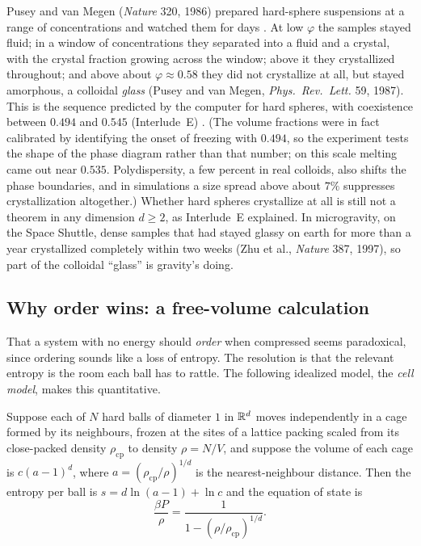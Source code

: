 Pusey and van Megen (\emph{Nature} 320, 1986) prepared hard-sphere suspensions at a range of
concentrations and watched them for days . At low $\varphi$ the samples stayed fluid;
in a window of concentrations they separated into a fluid and a crystal, with the crystal fraction
growing across the window; above it they crystallized throughout; and above about $\varphi\approx0.58$ they
did not crystallize at all, but stayed amorphous, a colloidal \emph{glass} (Pusey and van Megen,
\emph{Phys.\ Rev.\ Lett.} 59, 1987). This is the sequence predicted by the computer for hard spheres, with coexistence between
$0.494$ and $0.545$ (Interlude~E) . (The volume fractions were in fact
calibrated by identifying the onset of freezing with $0.494$, so the experiment tests the shape of the
phase diagram rather than that number; on this scale melting came out near $0.535$. Polydispersity, a few
percent in real colloids, also shifts the phase boundaries, and in simulations a size spread above about
$7\%$ suppresses crystallization altogether.) Whether hard spheres crystallize at all is still not a theorem in any dimension
$d\ge2$, as Interlude~E explained. In microgravity, on the Space Shuttle, dense samples that had stayed glassy on
earth for more than a year crystallized completely within two weeks (Zhu et al., \emph{Nature} 387,
1997), so part of the colloidal ``glass'' is gravity's doing.

\subsection*{Why order wins: a free-volume calculation}
That a system with no energy should \emph{order} when compressed seems paradoxical, since ordering
sounds like a loss of entropy. The resolution is that the relevant entropy is the room each ball has to
rattle. The following idealized model, the \emph{cell model}, makes this quantitative.

\begin{proposition}\label{PHYS:prop:cell}
Suppose each of $N$ hard balls of diameter $1$ in $\mathbb{R}^d$ moves independently in a cage formed by its
neighbours, frozen at the sites of a lattice packing scaled from its close-packed density $\rho_{\mathrm{cp}}$
to density $\rho=N/V$, and suppose the volume of each cage is $c(a-1)^d$, where
$a=(\rho_{\mathrm{cp}}/\rho)^{1/d}$ is the nearest-neighbour distance. Then the entropy per ball is
$s=d\ln(a-1)+\ln c$ and the equation of state is
\[
  \frac{\beta P}{\rho}=\frac1{1-(\rho/\rho_{\mathrm{cp}})^{1/d}} .
\]
\end{proposition}

